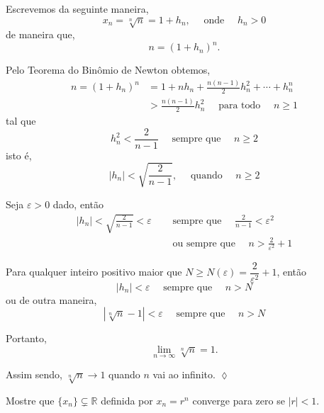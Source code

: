 \solo Escrevemos da seguinte maneira,
\begin{equation*}
    x_n=\sqrt[n]{n}=1+h_n,\quad \text{ onde }\quad h_n>0
\end{equation*}
de maneira que,
\begin{equation*}
    n=(1+h_n)^n.
\end{equation*}

Pelo Teorema do Bin\^{o}mio de Newton obtemos,
\begin{align*}
    n=(1+h_n)^n&=1+nh_n+\frac{n(n-1)}{2}h_n^2+\cdots+h_n^n\\[2ex]
               &>\frac{n(n-1)}{2}h_n^2\quad \text{ para todo }\quad n\geq 1
\end{align*}
tal que
\begin{equation*}
    h_n^2<\frac{2}{n-1}\quad \text{ sempre que }\quad n\geq 2
\end{equation*}
isto \'{e},
\begin{equation*}
    |h_n|<\sqrt{\frac{2}{n-1}}, \quad \text{ quando }\quad n\geq 2
\end{equation*}

Seja $\varepsilon>0$ dado, ent\~{a}o
\begin{align*}
|h_n|<\sqrt{\frac{2}{n-1}}<\varepsilon\quad &\text{ sempre que }\quad \frac{2}{n-1}<\varepsilon^2\\
  &\text{ ou sempre que }\quad n>\frac{2}{\varepsilon^2}+1
\end{align*}

Para qualquer inteiro positivo maior que $N\geq N(\varepsilon)=\dfrac{2}{\varepsilon^2}+1$, ent\~{a}o
\begin{equation*}
    |h_n|<\varepsilon\quad \text{ sempre que }\quad n >N
\end{equation*}
ou de outra maneira,
\begin{equation*}
    |\sqrt[n]{n}-1|<\varepsilon \quad \text{ sempre que }\quad n > N
\end{equation*}

Portanto,
\begin{equation*}
 \lim_{n\to \infty}\sqrt[n]{n}=1.
\end{equation*}

Assim sendo, $\sqrt[n]{n}\to 1$ quando $n$ vai ao infinito. \hfill \(\lozenge\)

\begin{exer}
Mostre que \seq $\{x_n \}\subsetneq \mathbb{R}$ definida por $x_n=r^n$ converge para zero se $|r|<1$.
\end{exer}

